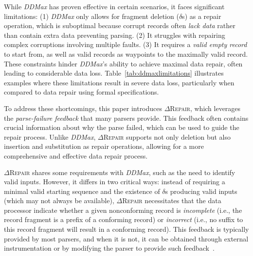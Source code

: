 \documentclass[sigconf,review,anonymous]{acmart}
\newcommand{\dtask}{data repair\xspace}
\newcommand{\approach}{\textsc{$\Delta$Repair}\xspace}
\newcommand{\ddmax}{\textit{DDMax}\xspace}
\newcommand{\drepair}{\approach}
\begin{document}
While \ddmax has proven effective in certain scenarios, it faces significant
limitations: (1) \ddmax only allows for fragment deletion ($\delta$s) as a
repair operation, which is suboptimal because corrupt records often \emph{lack
data} rather than contain extra data preventing parsing. (2) It struggles with
repairing complex corruptions involving multiple faults. (3) It requires a
\emph{valid empty record} to start from, as well as valid records as waypoints
to the maximally valid record. These constraints hinder \ddmax's ability to
achieve maximal data repair, often leading to considerable data loss.
Table~\ref{tab:ddmaxlimitations} illustrates examples where these limitations result in severe
data loss, particularly when compared to \dtask using formal specifications.

To address these shortcomings, this paper introduces \drepair, which leverages
the \emph{parse-failure feedback} that many parsers provide. This feedback
often contains crucial information about why the parse failed, which can be
used to guide the repair process. Unlike \ddmax, \drepair supports not only
deletion but also insertion and substitution as repair operations, allowing for
a more comprehensive and effective data repair process.

\drepair shares some requirements with \ddmax, such as the need to identify
valid inputs. However, it differs in two critical ways: instead of requiring a
minimal valid starting sequence and the existence of $\delta$s producing valid
inputs (which may not always be available), \drepair necessitates that the data
processor indicate whether a given nonconforming record is \emph{incomplete}
(i.e., the record fragment is a prefix of a conforming record) or
\emph{incorrect} (i.e., no suffix to this record fragment will result in a
conforming record). This feedback is typically provided by most parsers, and
when it is not, it can be obtained through external instrumentation or by
modifying the parser to provide such feedback~\cite{mathis2019parser}.

\end{document}
